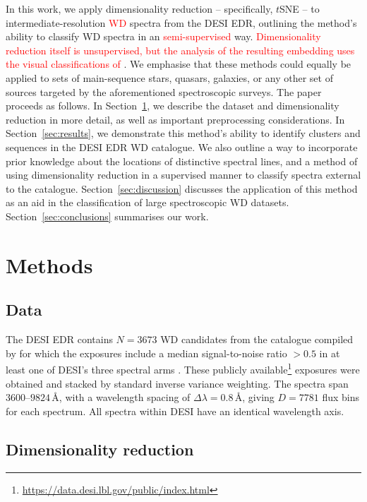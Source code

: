 \documentclass[fleqn,usenatbib]{mnras}
\newcommand{\red}[1]{\textcolor{red}{#1}}
\begin{document}
In this work, we apply dimensionality reduction -- specifically, $t$SNE -- to intermediate-resolution \red{WD} spectra from the DESI EDR, outlining the method's ability to classify WD spectra in an \red{semi-supervised} way.
\red{Dimensionality reduction itself is unsupervised, but the analysis of the resulting embedding uses the visual classifications of \citet{manser24}}.
We emphasise that these methods could equally be applied to sets of main-sequence stars, quasars, galaxies, or any other set of sources targeted by the aforementioned spectroscopic surveys.
The paper proceeds as follows.
In Section~\ref{sec:methods}, we describe the dataset and dimensionality reduction in more detail, as well as important preprocessing considerations.
In Section~\ref{sec:results}, we demonstrate this method's ability to identify clusters and sequences in the DESI EDR WD catalogue.
We also outline a way to incorporate prior knowledge about the locations of distinctive spectral lines, and a method of using dimensionality reduction in a supervised manner to classify spectra external to the catalogue.
Section~\ref{sec:discussion} discusses the application of this method as an aid in the classification of large spectroscopic WD datasets.
Section~\ref{sec:conclusions} summarises our work.

\section{Methods}
\label{sec:methods}

\subsection{Data}

The DESI EDR contains $N=3673$ WD candidates from the catalogue compiled by \citet{gentilefusillo19} for which the exposures include a median signal-to-noise ratio $>0.5$ in at least one of DESI's three spectral arms \citep{manser24}.
These publicly available\footnote{
    \url{https://data.desi.lbl.gov/public/index.html}
} exposures were obtained and stacked by standard inverse variance weighting.
The spectra span $3600$--$9824\,\text{\AA}$, with a wavelength spacing of $\Delta \lambda = 0.8\,\text{\AA}$, giving $D=7781$ flux bins for each spectrum.
All spectra within DESI have an identical wavelength axis.

\subsection{Dimensionality reduction}
\end{document}
